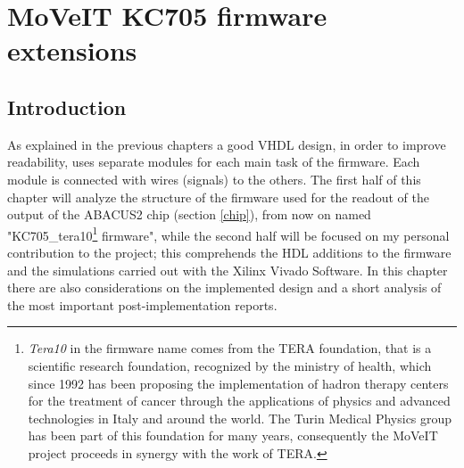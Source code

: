 \chapter{MoVeIT KC705 firmware extensions}
\section{Introduction}
\noindent As explained in the previous chapters a good VHDL design, in order to improve readability, uses separate modules for each main task of the firmware. Each module is connected with wires (signals) to the others. The first half of this chapter will analyze the structure of the firmware used for the readout of the output of the ABACUS2 chip (section \ref{chip}), from now on named "KC705\_tera10\footnote{\emph{Tera10} in the firmware name comes from the TERA foundation, that is a scientific research foundation, recognized by the ministry of health, which since 1992 has been proposing the implementation of hadron therapy centers for the treatment of cancer through the applications of physics and advanced technologies in Italy and around the world. The Turin Medical Physics group has been part of this foundation for many years, consequently the MoVeIT project proceeds in synergy with the work of TERA.} firmware", while the second half will be focused on my personal contribution to the project; this comprehends the HDL additions to the firmware and the simulations carried out with the Xilinx Vivado Software.
In this chapter there are also considerations on the implemented design and a short analysis of the most important post-implementation reports.

